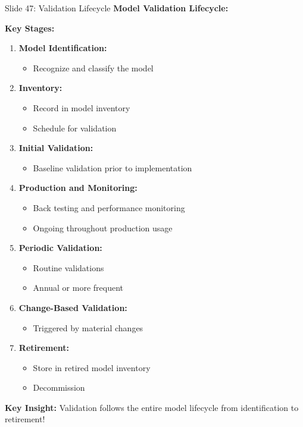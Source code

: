 \documentclass[8pt]{beamer}
\begin{document}
	\begin{frame}{Slide 47: Validation Lifecycle}
		\fontsize{6.5}{7.5}\selectfont
		\textbf{Model Validation Lifecycle:}
		
		\vspace{0.1cm}
		\textbf{Key Stages:}
		\begin{enumerate}
			\item \textbf{Model Identification:}
			\begin{itemize}
				\item Recognize and classify the model
			\end{itemize}
			\item \textbf{Inventory:}
			\begin{itemize}
				\item Record in model inventory
				\item Schedule for validation
			\end{itemize}
			\item \textbf{Initial Validation:}
			\begin{itemize}
				\item Baseline validation prior to implementation
			\end{itemize}
			\item \textbf{Production and Monitoring:}
			\begin{itemize}
				\item Back testing and performance monitoring
				\item Ongoing throughout production usage
			\end{itemize}
			\item \textbf{Periodic Validation:}
			\begin{itemize}
				\item Routine validations
				\item Annual or more frequent
			\end{itemize}
			\item \textbf{Change-Based Validation:}
			\begin{itemize}
				\item Triggered by material changes
			\end{itemize}
			\item \textbf{Retirement:}
			\begin{itemize}
				\item Store in retired model inventory
				\item Decommission
			\end{itemize}
		\end{enumerate}
		
		\textcolor{myblue}{\textbf{Key Insight:}} Validation follows the \textcolor{myblue}{entire model lifecycle from identification to retirement}!
	\end{frame}
	
\end{document}
